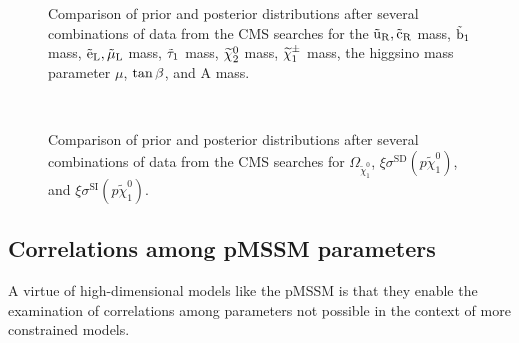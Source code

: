 \begin{figure}[p]
\centering
{}\\
\\
\vspace{1mm}
\caption{Comparison of prior and posterior distributions after several combinations of data from the CMS searches for the
$\suR,\scR$ mass, $\sb_{1}$ mass, $\seL,\smuL$ mass, $\stauOne$ mass, $\chitz$ mass, $\chipm$ mass, the higgsino mass parameter $\mu$, $\tanb$, and A mass.}
\label{fig:more1D}
\end{figure}

\begin{figure}[htbp]
  \centering
  \\
        \vspace{1mm}
    \caption{Comparison of prior and posterior distributions after several
  combinations of data from the CMS searches for $\Omega_{\tilde{\chi}^{0}_{1}}$, $\xi\sigma^{\text{SD}}(p\tilde{\chi}_{1}^{0})$, and $\xi\sigma^{\text{SI}}(p\tilde{\chi}_{1}^{0})$.}
    \label{fig:more1D_dm}
\end{figure}

\subsection{Correlations among pMSSM parameters}
A virtue of high-dimensional models like the pMSSM is that they
enable the examination of correlations among parameters not 
possible in the context of more constrained models.

